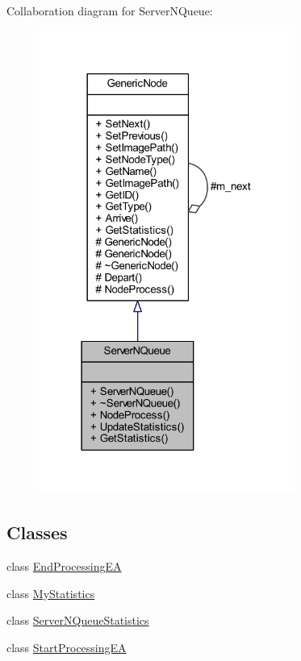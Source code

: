 Collaboration diagram for Server\+N\+Queue\+:
\nopagebreak
\begin{figure}[H]
\begin{center}
\leavevmode
\includegraphics[width=238pt]{class_server_n_queue__coll__graph}
\end{center}
\end{figure}
\subsection*{Classes}
\begin{DoxyCompactItemize}
\item 
class \hyperlink{class_server_n_queue_1_1_end_processing_e_a}{End\+Processing\+EA}
\item 
class \hyperlink{class_server_n_queue_1_1_my_statistics}{My\+Statistics}
\item 
class \hyperlink{class_server_n_queue_1_1_server_n_queue_statistics}{Server\+N\+Queue\+Statistics}
\item 
class \hyperlink{class_server_n_queue_1_1_start_processing_e_a}{Start\+Processing\+EA}
\end{DoxyCompactItemize}
